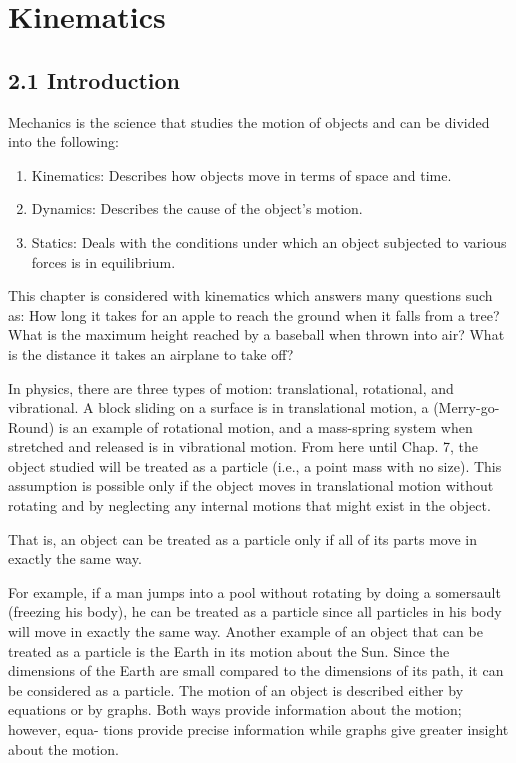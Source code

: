 \documentclass[10pt]{article}
\begin{document}
\section*{Kinematics}
\subsection*{2.1 Introduction}
Mechanics is the science that studies the motion of objects and can be divided into the following:

\begin{enumerate}
  \item Kinematics: Describes how objects move in terms of space and time.
  \item Dynamics: Describes the cause of the object's motion.
  \item Statics: Deals with the conditions under which an object subjected to various forces is in equilibrium.
\end{enumerate}

This chapter is considered with kinematics which answers many questions such as: How long it takes for an apple to reach the ground when it falls from a tree? What is the maximum height reached by a baseball when thrown into air? What is the distance it takes an airplane to take off?

In physics, there are three types of motion: translational, rotational, and vibrational. A block sliding on a surface is in translational motion, a (Merry-go-Round) is an example of rotational motion, and a mass-spring system when stretched and released is in vibrational motion. From here until Chap. 7, the object studied will be treated as a particle (i.e., a point mass with no size). This assumption is possible only if the object moves in translational motion without rotating and by neglecting any internal motions that might exist in the object.

That is, an object can be treated as a particle only if all of its parts move in exactly the same way.

For example, if a man jumps into a pool without rotating by doing a somersault (freezing his body), he can be treated as a particle since all particles in his body will move in exactly the same way. Another example of an object that can be treated as a particle is the Earth in its motion about the Sun. Since the dimensions of the Earth are small compared to the dimensions of its path, it can be considered as a particle. The motion of an object is described either by equations or by graphs. Both ways provide information about the motion; however, equa- tions provide precise information while graphs give greater insight about the motion.
\end{document}
